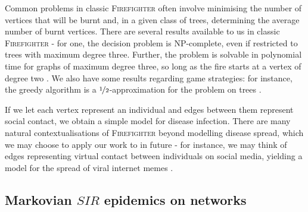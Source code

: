 \documentclass[../report.tex]{subfiles}
\begin{document}
\begin{center}
\noindent{}%
\end{center}

Common problems in classic {\scshape Firefighter} often involve minimising the number of vertices that will be burnt and, in a given class of trees, determining the average number of burnt vertices. There are several results available to us in classic {\scshape Firefighter} - for one, the decision problem is NP-complete, even if restricted to trees with maximum degree three. Further, the problem is solvable in polynomial time for graphs of maximum degree three, so long as the fire starts at a vertex of degree two \cite{finbow_2009}. We also have some results regarding game strategies: for instance, the greedy algorithm is a $\nicefrac{1}{2}$-approximation for the problem on trees \cite{finbow_2009}.

If we let each vertex represent an individual and edges between them represent social contact, we obtain a simple model for disease infection. There are many natural contextualisations of {\scshape Firefighter} beyond modelling disease spread, which we may choose to apply our work to in future - for instance, we may think of edges representing virtual contact between individuals on social media, yielding a model for the spread of viral internet memes \cite{obrien_2019}.


\subsection{Markovian $SIR$ epidemics on networks}
\label{subsec:SIR-lit}
\end{document}
